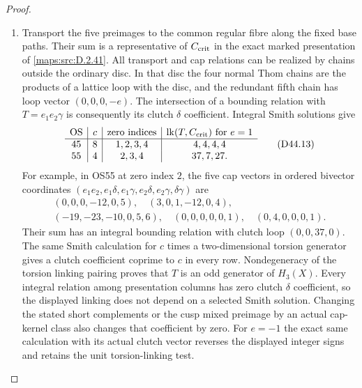 \begin{proof}
\begin{enumerate}[label=\arabic*.,leftmargin=*]
\item Transport the five preimages to the common regular fibre along
the fixed base paths. Their sum is a representative of
$C_{\rm crit}$ in the exact marked presentation of \ref{maps:src:D.2.41}.
All transport and cap relations can be realized by chains
outside the ordinary disc. In that disc the four normal
Thom chains are the products of a lattice loop with the
disc, and the redundant fifth chain has loop vector
$(0,0,0,-e)$. The intersection of a bounding relation with
$T=e_1e_2\gamma$ is consequently its clutch $\delta$
coefficient. Integral Smith solutions give
\[
 \begin{array}{c|c|c|c}
  \mathrm{OS}&c&\text{zero indices}&
       \operatorname{lk}(T,C_{\rm crit})\text{ for }e=1\\\hline
  45&8&1,2,3,4&4,4,4,4\\
  55&4&2,3,4&37,7,27.
 \end{array}                                                  \tag{D44.13}\label{maps:eq:D44.13}
\]
For example, in OS55 at zero index $2$, the five cap vectors
in ordered bivector coordinates
$(e_1e_2,e_1\delta,e_1\gamma,e_2\delta,e_2\gamma,\delta\gamma)$
are
\[
 \begin{gathered}
 (0,0,0,-12,0,5),\quad(3,0,1,-12,0,4),\\
 (-19,-23,-10,0,5,6),\quad(0,0,0,0,0,1),\quad(0,4,0,0,0,1).
 \end{gathered}                                               \tag{D44.14}\label{maps:eq:D44.14}
\]
Their sum has an integral bounding relation with clutch loop
$(0,0,37,0)$. The same Smith calculation for $c$ times a
two-dimensional torsion generator gives a clutch coefficient
coprime to $c$ in every row. Nondegeneracy of the torsion
linking pairing proves that $T$ is an odd generator of
$H_3(X)$. Every integral relation among presentation columns
has zero clutch $\delta$ coefficient, so the displayed
linking does not depend on a selected Smith solution.
Changing the stated short complements or the cusp mixed
preimage by an actual cap-kernel class also changes that
coefficient by zero. For $e=-1$ the exact same calculation
with its actual clutch vector reverses the displayed integer
signs and retains the unit torsion-linking test.


\end{enumerate}
\end{proof}

